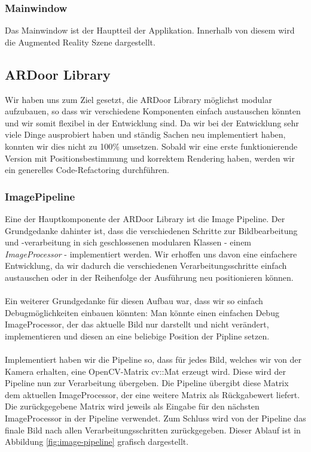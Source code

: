 \documentclass[main.tex]{subfiles}
\begin{document}
\subsubsection{Mainwindow}
Das Mainwindow ist der Hauptteil der Applikation. Innerhalb von diesem wird die Augmented Reality Szene dargestellt.

\subsection{ARDoor Library}
Wir haben uns zum Ziel gesetzt, die ARDoor Library möglichst modular aufzubauen, so dass wir verschiedene Komponenten einfach austauschen könnten und wir somit flexibel in der Entwicklung sind. Da wir bei der Entwicklung sehr viele Dinge ausprobiert haben und ständig Sachen neu implementiert haben, konnten wir dies nicht zu 100\% umsetzen. Sobald wir eine erste funktionierende Version mit Positionsbestimmung und korrektem Rendering haben, werden wir ein generelles Code-Refactoring durchführen.

\subsubsection{ImagePipeline}
Eine der Hauptkomponente der ARDoor Library ist die Image Pipeline. Der Grundgedanke dahinter ist, dass die verschiedenen Schritte zur Bildbearbeitung und -verarbeitung in sich geschlossenen modularen Klassen - einem \textit{ImageProcessor} - implementiert werden. Wir erhoffen uns davon eine einfachere Entwicklung, da wir dadurch die verschiedenen Verarbeitungsschritte einfach austauschen oder in der Reihenfolge der Ausführung neu positionieren können.

\paragraph{}
Ein weiterer Grundgedanke für diesen Aufbau war, dass wir so einfach Debugmöglichkeiten einbauen könnten: Man könnte einen einfachen Debug ImageProcessor, der das aktuelle Bild nur darstellt und nicht verändert, implementieren und diesen an eine beliebige Position der Pipline setzen.

\paragraph{}
Implementiert haben wir die Pipeline so, dass für jedes Bild, welches wir von der Kamera erhalten, eine OpenCV-Matrix cv::Mat erzeugt wird. Diese wird der Pipeline nun zur Verarbeitung übergeben. Die Pipeline übergibt diese Matrix dem aktuellen ImageProcessor, der eine weitere Matrix als Rückgabewert liefert. Die zurückgegebene Matrix wird jeweils als Eingabe für den nächsten ImageProcessor in der Pipeline verwendet. Zum Schluss wird von der Pipeline das finale Bild nach allen Verarbeitungsschritten zurückgegeben. Dieser Ablauf ist in Abbildung \ref{fig:image-pipeline} grafisch dargestellt.
\end{document}

